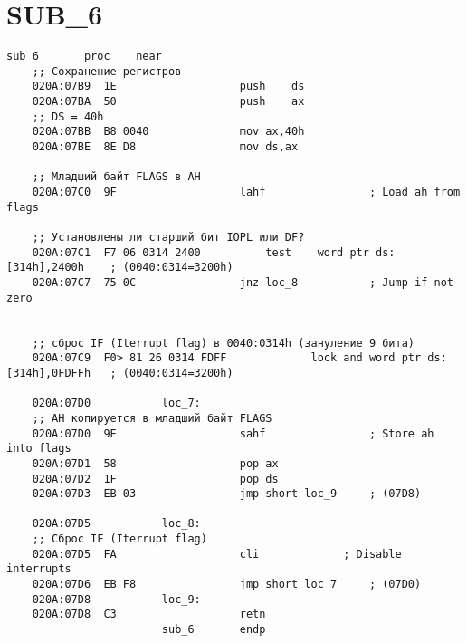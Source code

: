 \documentclass[a4paper,12pt]{bmstu}
\begin{document}
\section{SUB\_6}\label{sec:sub_6}
\begin{lstlisting}[style={asm},label={lst:SUB_6}]
                        sub_6		proc	near
    ;; Сохранение регистров
    020A:07B9  1E					push	ds
    020A:07BA  50					push	ax
    ;; DS = 40h
    020A:07BB  B8 0040				mov	ax,40h
    020A:07BE  8E D8				mov	ds,ax

    ;; Младший байт FLAGS в AH
    020A:07C0  9F					lahf				; Load ah from flags

    ;; Установлены ли старший бит IOPL или DF?
    020A:07C1  F7 06 0314 2400			test	word ptr ds:[314h],2400h	; (0040:0314=3200h)
    020A:07C7  75 0C				jnz	loc_8			; Jump if not zero


    ;; сброс IF (Iterrupt flag) в 0040:0314h (зануление 9 бита)
    020A:07C9  F0> 81 26 0314 FDFF	           lock	and	word ptr ds:[314h],0FDFFh	; (0040:0314=3200h)

    020A:07D0			loc_7:
    ;; AH копируется в младший байт FLAGS
    020A:07D0  9E					sahf				; Store ah into flags
    020A:07D1  58					pop	ax
    020A:07D2  1F					pop	ds
    020A:07D3  EB 03				jmp	short loc_9		; (07D8)

    020A:07D5			loc_8:
    ;; Сброс IF (Iterrupt flag)
    020A:07D5  FA					cli				; Disable interrupts
    020A:07D6  EB F8				jmp	short loc_7		; (07D0)
    020A:07D8			loc_9:
    020A:07D8  C3					retn
                        sub_6		endp
\end{lstlisting}

\clearpage
\end{document}
